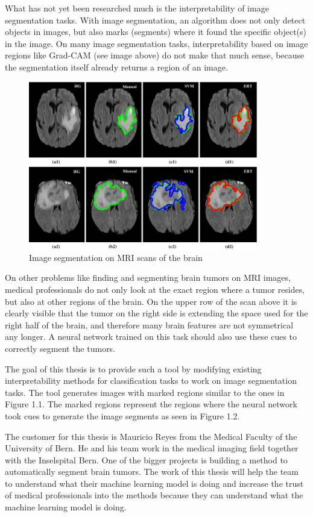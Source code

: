 What has not yet been researched much is the interpretability of image segmentation tasks. With image segmentation, an algorithm does not only detect objects in images, but also marks (segments) where it found the specific object(s) in the image. On many image segmentation tasks, interpretability based on image regions like Grad-CAM (see image above) do not make that much sense, because the segmentation itself already returns a region of an image.

\begin{figure}[H]
\centering
\caption{Image segmentation on MRI scans of the brain \cite{soltaninejad2017automated}}
\includegraphics[width=10cm]{images/brain_segmentation.jpg}
\end{figure}

On other problems like finding and segmenting brain tumors on MRI images, medical professionals do not only look at the exact region where a tumor resides, but also at other regions of the brain. On the upper row of the scan above it is clearly visible that the tumor on the right side is extending the space used for the right half of the brain, and therefore many brain features are not symmetrical any longer. A neural network trained on this task should also use these cues to correctly segment the tumors. 

The goal of this thesis is to provide such a tool by modifying existing interpretability methods for classification tasks to work on image segmentation tasks. The tool generates images with marked regions similar to the ones in Figure 1.1. The marked regions represent the regions where the neural network took cues to generate the image segments as seen in Figure 1.2.

The customer for this thesis is Mauricio Reyes from the Medical Faculty of the University of Bern. He and his team work in the medical imaging field together with the Inselspital Bern. One of the bigger projects is building a method to automatically segment brain tumors. The work of this thesis will help the team to understand what their machine learning model is doing and increase the trust of medical professionals into the methods because they can understand what the machine learning model is doing.

